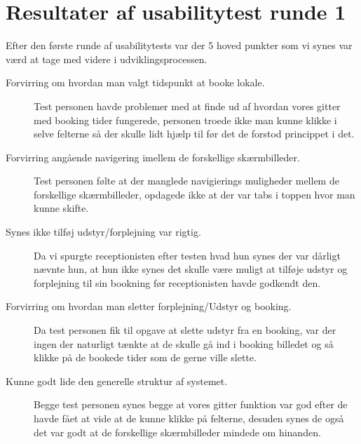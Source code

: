\section{Resultater af usabilitytest runde 1 }
Efter den første runde af usabilitytests var der 5 hoved punkter som vi synes var værd at tage med videre i udviklingsprocessen.
\begin{description}
\item [Forvirring om hvordan man valgt tidspunkt at booke lokale.]
Test personen havde problemer med at finde ud af hvordan vores gitter med booking tider fungerede, personen troede ikke man kunne klikke i selve felterne så der skulle lidt hjælp til før det de forstod princippet i det.
\item [Forvirring angående navigering imellem de forskellige skærmbilleder.]
Test personen følte at der manglede navigierings muligheder mellem de forskellige skærmbilleder, opdagede ikke at der var tabs i toppen hvor man kunne skifte.
\item [Synes ikke tilføj udstyr/forplejning var rigtig.]
Da vi spurgte receptionisten efter testen hvad hun synes der var dårligt nævnte hun, at hun ikke synes det skulle være muligt at tilføje udstyr og forplejning til sin bookning før receptionisten havde godkendt den. 
\item [Forvirring om hvordan man sletter forplejning/Udstyr og booking.]
Da test personen fik til opgave at slette udstyr fra en booking, var der ingen der naturligt tænkte at de skulle gå ind i booking billedet og så klikke på de bookede tider som de gerne ville slette.
\item [Kunne godt lide den generelle struktur af systemet.]
Begge test personen synes begge at vores gitter funktion var god efter de havde fået at vide at de kunne klikke på felterne, desuden synes de også det var godt at de forskellige skærmbilleder mindede om hinanden.
\end{description}

